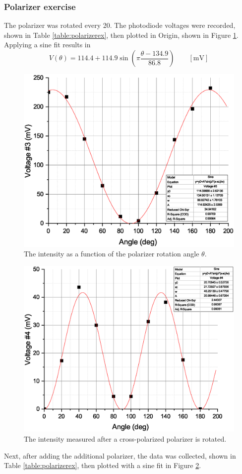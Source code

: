 \documentclass[notitlepage]{report}
\begin{document}
	\subsubsection{Polarizer exercise}
	The polarizer was rotated every \SI{20}{\deg}. The photodiode voltages were recorded, shown in Table \ref{table:polarizerex}, then plotted in Origin, shown in Figure \ref{fig:graph1}. Applying a sine fit results in \begin{equation}
		V(\theta) = 114.4 + 114.9 \sin(\pi \frac{\theta - 134.9}{86.8}) \qquad [\si{\mV}] \label{eq:sinefit}
	\end{equation}
	
	\begin{figure}[p]
		\centering
		\includegraphics[width=0.9\linewidth]{Graph1}
		\caption{The intensity as a function of the polarizer rotation angle $\theta$.}
		\label{fig:graph1}
	\end{figure}
	
	\begin{figure}[p]
		\centering
		\includegraphics[width=0.9\linewidth]{Graph2}
		\caption{The intensity measured after a cross-polarized polarizer is rotated.}
		\label{fig:graph2}
	\end{figure}
	Next, after adding the additional polarizer, the data was collected, shown in Table \ref{table:polarizerex}, then plotted with a sine fit in Figure \ref{fig:graph2}.
	
\end{document}
